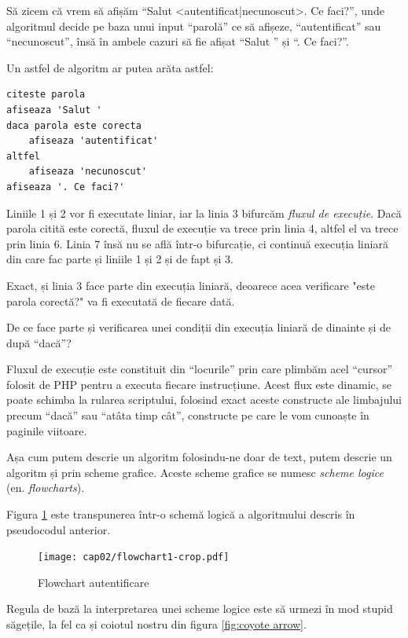 Să zicem că vrem să afișăm ``Salut <autentificat|necunoscut>. Ce faci?'',
unde algoritmul decide pe baza unui input ``parolă'' ce să afișeze, ``autentificat''
sau ``necunoscut'', însă în ambele cazuri să fie afișat ``Salut '' și ``. Ce faci?''.

Un astfel de algoritm ar putea arăta astfel:
\begin{lstlisting}[language=pseudocod]
citeste parola
afiseaza 'Salut '
daca parola este corecta
	afiseaza 'autentificat'
altfel
	afiseaza 'necunoscut'
afiseaza '. Ce faci?'
\end{lstlisting}

Liniile 1 și 2 vor fi executate liniar, iar la linia 3 bifurcăm \textsl{fluxul de execuție}.
Dacă parola citită este corectă, fluxul de execuție va trece prin linia 4, altfel
el va trece prin linia 6. Linia 7 însă nu se află într-o bifurcație, ci continuă
execuția liniară din care fac parte și liniile 1 și 2 și de fapt și 3.

Exact, și linia 3 face parte din execuția liniară, deoarece acea verificare "este
parola corectă?" va fi executată de fiecare dată.

\begin{Exercise}[title={Execuția liniară conține și verificarea condiției},difficulty=1]
De ce face parte și verificarea unei condiții din execuția liniară de dinainte și de după
``dacă''?
\end{Exercise}


Fluxul de execuție este constituit din ``locurile'' prin care plimbăm
acel ``cursor'' folosit de PHP pentru a executa fiecare instrucțiune.
Acest flux este dinamic, se poate schimba la rularea scriptului,
folosind exact aceste constructe ale limbajului precum ``dacă'' sau ``atâta timp cât'',
constructe pe care le vom cunoaște în paginile viitoare.

Așa cum putem descrie un algoritm folosindu-ne doar de text, putem
descrie un algoritm și prin scheme grafice. Aceste scheme grafice se numesc
\textit{scheme logice} (en. \textsl{flowcharts}).

Figura \ref{fig:flowchart authenticated} este transpunerea
într-o schemă logică a algoritmului descris în pseudocodul anterior.

\begin{figure}[ht!]
  \centering
    \texttt{[image: cap02/flowchart1-crop.pdf]}
  \caption{Flowchart autentificare}
  \label{fig:flowchart authenticated}
\end{figure}

Regula de bază la interpretarea unei scheme logice
este să urmezi în mod stupid săgețile, la fel ca și
coiotul nostru din figura \ref{fig:coyote arrow}.

